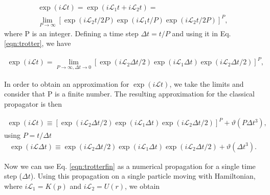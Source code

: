 \begin{equation}
\begin{aligned}
\exp (i\mathcal{L}t)  = \exp (i\mathcal{L}_{1}t + i\mathcal{L}_{2}t) = \\
\lim\limits_{P \rightarrow \infty} \left [ \exp (i\mathcal{L}_{2}t/2P) \exp (i\mathcal{L}_{1}t/P) \exp (i\mathcal{L}_{2}t/2P) \right ]^{P},
\end{aligned}
\label{eqn:trotter}
\end{equation}
where P is an integer. Defining a time step $\Delta t =t/P$ and using it in Eq. \ref{eqn:trotter}, we have

\begin{equation}
\begin{aligned}
\exp (i\mathcal{L}t)  = 
\lim\limits_{P \rightarrow \infty, \Delta t \rightarrow 0} \left [ \exp (i\mathcal{L}_{2} \Delta t/2) \exp (i\mathcal{L}_{1} \Delta t) \exp (i\mathcal{L}_{2} \Delta t/2) \right ]^{P},
\end{aligned}
\label{eqn:trotterdt}
\end{equation}

In order to obtain an approximation for $\exp (i\mathcal{L}t)$, we take the limits and consider that P is a finite number. The resulting approximation for the classical propagator is then 

\begin{equation}
\begin{aligned}
\exp (i\mathcal{L}t)  \equiv
\left [ \exp (i\mathcal{L}_{2} \Delta t/2) \exp (i\mathcal{L}_{1} \Delta t) \exp (i\mathcal{L}_{2} \Delta t/2) \right ]^{P} + \vartheta (P \Delta t^{3}),
\end{aligned}
\end{equation}
using $P= t/\Delta t$
\begin{equation}
\begin{aligned}
\exp (i\mathcal{L} \Delta t)  \equiv
\exp (i\mathcal{L}_{2} \Delta t/2) \exp (i\mathcal{L}_{1} \Delta t) \exp (i\mathcal{L}_{2} \Delta t/2)  + \vartheta (\Delta t^{3}).
\end{aligned}
\label{eqn:trotterfin}
\end{equation}  

Now we can use Eq. \ref{eqn:trotterfin} as a numerical propagation for a single time step ($\Delta t$). Using this propagation on a single particle moving with Hamiltonian, where $i\mathcal{L}_{1} = K (p)$ and $i\mathcal{L}_{2} = U (r)$, we obtain

